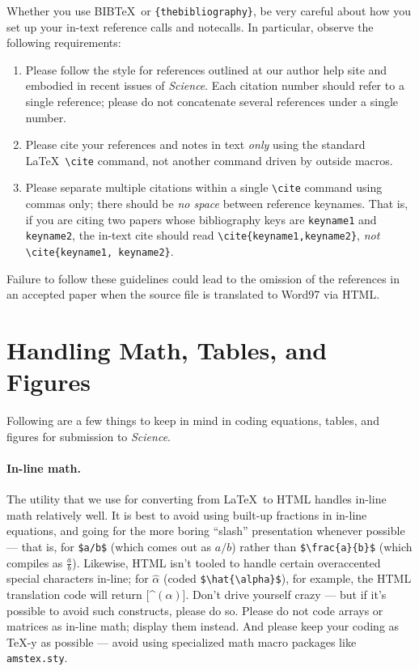 \documentclass[12pt]{article}
\begin{document}
Whether you use B{\small{IB}}\TeX\ or \texttt{\{thebibliography\}}, be
very careful about how you set up your in-text reference calls and
notecalls.  In particular, observe the following requirements:

\begin{enumerate}
\item Please follow the style for references outlined at our author
  help site and embodied in recent issues of {\it Science}.  Each
  citation number should refer to a single reference; please do not
  concatenate several references under a single number.
\item Please cite your references and notes in text {\it only\/} using
  the standard \LaTeX\ \verb+\cite+ command, not another command
  driven by outside macros.
\item Please separate multiple citations within a single \verb+\cite+
  command using commas only; there should be {\it no space\/}
  between reference keynames.  That is, if you are citing two
  papers whose bibliography keys are \texttt{keyname1} and
  \texttt{keyname2}, the in-text cite should read
  \verb+\cite{keyname1,keyname2}+, {\it not\/}
  \verb+\cite{keyname1, keyname2}+.
\end{enumerate}

\noindent Failure to follow these guidelines could lead
to the omission of the references in an accepted paper when the source
file is translated to Word97 via HTML.

\section*{Handling Math, Tables, and Figures}

Following are a few things to keep in mind in coding equations,
tables, and figures for submission to {\it Science}.

\paragraph*{In-line math.}  The utility that we use for converting
from \LaTeX\ to HTML handles in-line math relatively well.  It is best
to avoid using built-up fractions in in-line equations, and going for
the more boring ``slash'' presentation whenever possible --- that is,
for \verb+$a/b$+ (which comes out as $a/b$) rather than
\verb+$\frac{a}{b}$+ (which compiles as $\frac{a}{b}$).  Likewise,
HTML isn't tooled to handle certain overaccented special characters
in-line; for $\hat{\alpha}$ (coded \verb+$\hat{\alpha}$+), for
example, the HTML translation code will return [\^{}$(\alpha)$].
Don't drive yourself crazy --- but if it's possible to avoid such
constructs, please do so.  Please do not code arrays or matrices as
in-line math; display them instead.  And please keep your coding as
\TeX-y as possible --- avoid using specialized math macro packages
like \texttt{amstex.sty}.
\end{document}
